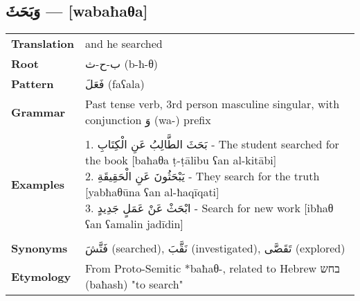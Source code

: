 \documentclass[letterpaper,12pt]{article}
\begin{document}
\subsection{\textarabic{وَبَحَثَ} — [wabaħaθa]}
\begin{tabular}{p{3cm}p{10cm}}
\toprule

\textbf{Translation} & and he searched \\
\textbf{Root} & \textarabic{ب-ح-ث} (b-ħ-θ) \\
\textbf{Pattern} & \textarabic{فَعَلَ} (faʕala) \\
\textbf{Grammar} & Past tense verb, 3rd person masculine singular, with conjunction \textarabic{وَ} (wa-) prefix \\
\midrule \\
\textbf{Examples} & \makecell[l]{\parbox{9.5cm}{
1. \textarabic{بَحَثَ الطَّالِبُ عَنِ الْكِتَابِ} - The student searched for the book [baħaθa ṭ-ṭālibu ʕan al-kitābi]\\
2. \textarabic{يَبْحَثُونَ عَنِ الْحَقِيقَةِ} - They search for the truth [yabħaθūna ʕan al-ħaqīqati]\\
3. \textarabic{ابْحَثْ عَنْ عَمَلٍ جَدِيدٍ} - Search for new work [ibħaθ ʕan ʕamalin jadīdin]
} } \\
\midrule \\
\textbf{Synonyms} & \textarabic{فَتَّشَ} (searched), \textarabic{نَقَّبَ} (investigated), \textarabic{تَقَصَّى} (explored) \\
\textbf{Etymology} & From Proto-Semitic *baħaθ-, related to Hebrew \texthebrew{בחש} (baħash) "to search" \\
\bottomrule
\end{tabular}
\end{document}
